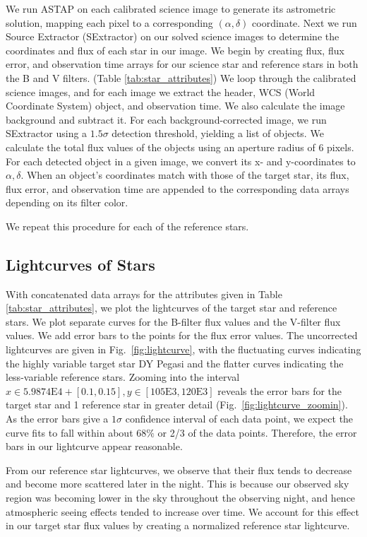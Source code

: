 \documentclass[twocolumn]{aastex631}
\newcommand{\RA}{\alpha}
\newcommand{\Dec}{\delta}
\begin{document}
We run ASTAP on each calibrated science image to generate its astrometric solution, mapping each pixel to a corresponding $(\RA, \Dec)$ coordinate. Next we run Source Extractor (SExtractor) on our solved science images to determine the coordinates and flux of each star in our image. \citep{Bertin_Arnouts_1996} We begin by creating flux, flux error, and observation time arrays for our science star and reference stars in both the B and V filters. (Table \ref{tab:star_attributes}) We loop through the calibrated science images, and for each image we extract the header, WCS (World Coordinate System) object, and observation time. We also calculate the image background and subtract it. For each background-corrected image, we run SExtractor using a $1.5 \sigma$ detection threshold, yielding a list of objects. We calculate the total flux values of the objects using an aperture radius of 6 pixels. For each detected object in a given image, we convert its x- and y-coordinates to $\RA, \Dec$. When an object's coordinates match with those of the target star, its flux, flux error, and observation time are appended to the corresponding data arrays depending on its filter color.

We repeat this procedure for each of the reference stars.

\subsection{Lightcurves of Stars} \label{subsec:starlightcurve}

With concatenated data arrays for the attributes given in Table \ref{tab:star_attributes}, we plot the lightcurves of the target star and reference stars. We plot separate curves for the B-filter flux values and the V-filter flux values. We add error bars to the points for the flux error values. The uncorrected lightcurves are given in Fig.\ \ref{fig:lightcurve}, with the fluctuating curves indicating the highly variable target star DY Pegasi and the flatter curves indicating the less-variable reference stars. Zooming into the interval $x\in 5.9874 \mathrm{E} 4 + [0.1, 0.15], y\in [105 \mathrm{E} 3, 120 \mathrm{E} 3]$ reveals the error bars for the target star and 1 reference star in greater detail (Fig.\ \ref{fig:lightcurve_zoomin}). As the error bars give a $1\sigma$ confidence interval of each data point, we expect the curve fits to fall within about $68\%$ or 2/3 of the data points. Therefore, the error bars in our lightcurve appear reasonable.

From our reference star lightcurves, we observe that their flux tends to decrease and become more scattered later in the night. This is because our observed sky region was becoming lower in the sky throughout the observing night, and hence atmospheric seeing effects tended to increase over time. We account for this effect in our target star flux values by creating a normalized reference star lightcurve.
\end{document}
